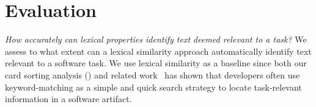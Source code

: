 \section{Evaluation}
\label{cp5:evaluation}



\textit{How accurately can lexical properties identify text deemed relevant to a task?}
    We assess to what extent can a lexical similarity approach automatically identify text relevant to a software task.
    We use lexical similarity as a baseline since both our card sorting analysis () and related work~\cite{Ko2006a, Freund2015} has shown
    that developers often use keyword-matching as a simple and quick search strategy to locate task-relevant information in a software artifact.














    


